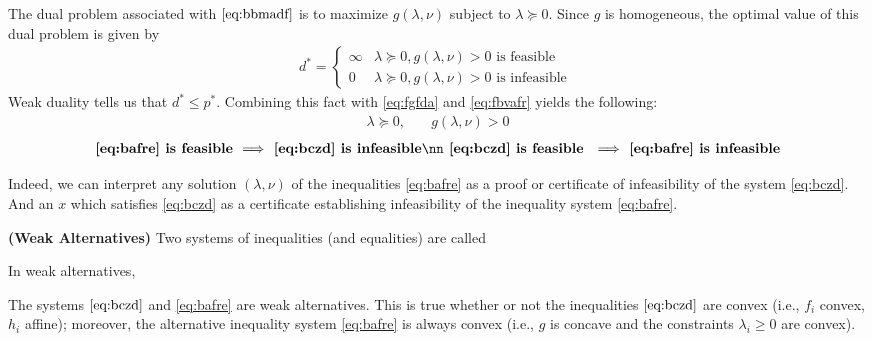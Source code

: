 \documentclass{article}
\newcommand{\bfs}[1]{\textbf{({#1}) }}
\begin{document}
The dual problem associated with $\cref{eq:bbmadf}$ is to maximize $g(\lambda, \nu)$ subject to $\lambda \succeq 0$. Since $g$ is homogeneous, the optimal value of this dual problem is given by
\begin{align}
  d^{* }= \begin{cases}\infty & \lambda \succeq 0, g(\lambda, \nu)>0 \text { is feasible } \\ 0 & \lambda \succeq 0, g(\lambda, \nu)>0 \text { is infeasible }\end{cases}  \label{eq:fbvafr}
\end{align}
Weak duality tells us that $d^{* } \leq p^{* }$. Combining this fact with \cref{eq:fgfda} and \cref{eq:fbvafr} yields the following:
\begin{align}
\lambda \succeq 0, &\quad g(\lambda, \nu)>0 \label{eq:bafre}
\end{align}
\begin{align}
 \textbf{ \cref{eq:bafre} is feasible }   &\Longrightarrow \textbf{ \cref{eq:bczd} is infeasible}\nn %
 \textbf{ \cref{eq:bczd} is feasible}   &\Longrightarrow  \textbf{ \cref{eq:bafre} is infeasible } \nonumber
\end{align}

Indeed, we can interpret any solution $(\lambda, \nu)$ of the inequalities \cref{eq:bafre} as a proof or certificate of infeasibility of the system \cref{eq:bczd}. And an $x$ which satisfies \cref{eq:bczd} as a certificate establishing infeasibility of the inequality system \cref{eq:bafre}.
\begin{defa}\bfs{Weak Alternatives}
Two systems of inequalities (and equalities) are called 
\end{defa}
\begin{rema}
In {weak alternatives}, 
\end{rema}
\begin{exma}
The systems $\cref{eq:bczd}$ and  \cref{eq:bafre} are weak alternatives. This is true whether or not the inequalities $\cref{eq:bczd}$ are convex (i.e., $f_{i}$ convex, $h_{i}$ affine); moreover, the alternative inequality system  \cref{eq:bafre} is always convex (i.e., $g$ is concave and the constraints $\lambda_{i} \geq 0$ are convex).
\end{exma}
\end{document}
